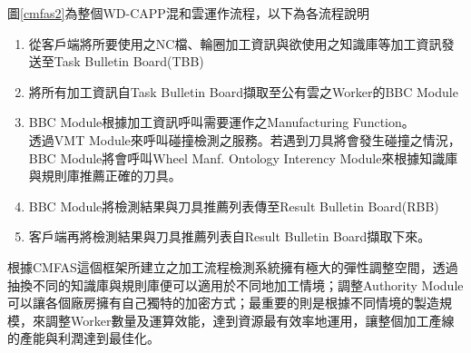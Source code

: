 \documentclass[CJK,12pt,t]{article}
\begin{document}
\begin{CJK*}{UTF8}{bkai}
		圖\ref{cmfas2}為整個WD-CAPP混和雲運作流程，以下為各流程說明

		\begin{enumerate}
		\setlength{\itemsep}{5pt}
			\item 從客戶端將所要使用之NC檔、輪圈加工資訊與欲使用之知識庫等加工資訊發送至Task Bulletin Board(TBB)
			\item 將所有加工資訊自Task Bulletin Board擷取至公有雲之Worker的BBC Module
			\item BBC Module根據加工資訊呼叫需要運作之Manufacturing Function。\\
					透過VMT Module來呼叫碰撞檢測之服務。若遇到刀具將會發生碰撞之情況，BBC Module將會呼叫Wheel Manf. Ontology Interency Module來根據知識庫與規則庫推薦正確的刀具。
			\item BBC Module將檢測結果與刀具推薦列表傳至Result Bulletin Board(RBB)
			\item 客戶端再將檢測結果與刀具推薦列表自Result Bulletin Board擷取下來。
		\end{enumerate}

		根據CMFAS這個框架所建立之加工流程檢測系統擁有極大的彈性調整空間，透過抽換不同的知識庫與規則庫便可以適用於不同地加工情境；調整Authority Module可以讓各個廠房擁有自己獨特的加密方式；最重要的則是根據不同情境的製造規模，來調整Worker數量及運算效能，達到資源最有效率地運用，讓整個加工產線的產能與利潤達到最佳化。
\end{CJK*}
\end{document}
